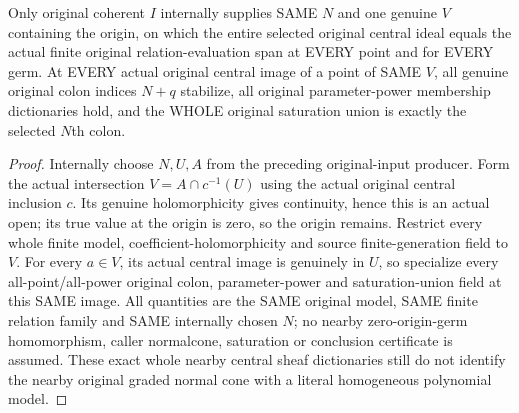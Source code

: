 \begin{theorem}
\label{hir:relative-normal-graph-central-nearby-whole-finite-model-and-saturation}
\leanok
Only original coherent $I$ internally supplies SAME $N$ and one genuine $V$ containing the origin, on which the entire selected original central ideal equals the actual finite original relation-evaluation span at EVERY point and for EVERY germ. At EVERY actual original central image of a point of SAME $V$, all genuine original colon indices $N+q$ stabilize, all original parameter-power membership dictionaries hold, and the WHOLE original saturation union is exactly the selected $N$th colon.
\end{theorem}
\begin{proof}
Internally choose $N,U,A$ from the preceding original-input producer. Form the actual intersection $V=A\cap c^{-1}(U)$ using the actual original central inclusion $c$. Its genuine holomorphicity gives continuity, hence this is an actual open; its true value at the origin is zero, so the origin remains. Restrict every whole finite model, coefficient-holomorphicity and source finite-generation field to $V$. For every $a\in V$, its actual central image is genuinely in $U$, so specialize every all-point/all-power original colon, parameter-power and saturation-union field at this SAME image. All quantities are the SAME original model, SAME finite relation family and SAME internally chosen $N$; no nearby zero-origin-germ homomorphism, caller normalcone, saturation or conclusion certificate is assumed. These exact whole nearby central sheaf dictionaries still do not identify the nearby original graded normal cone with a literal homogeneous polynomial model.
\end{proof}
